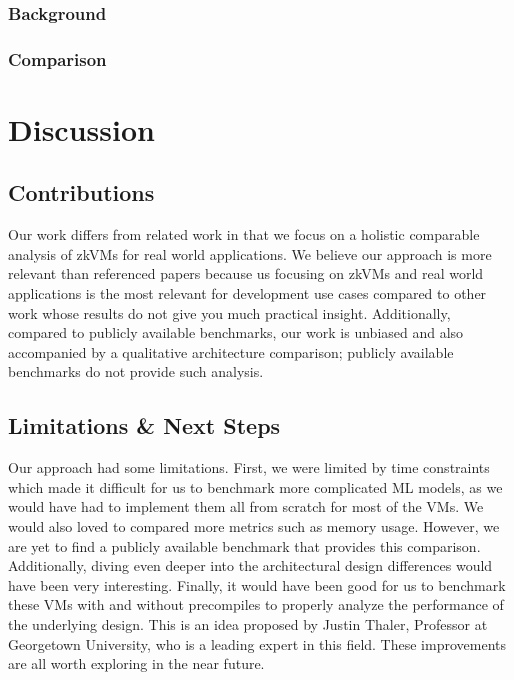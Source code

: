 \documentclass{scrartcl}
\begin{document}
\subsubsection{Background}

\subsubsection{Comparison}

\section{Discussion}
%

\subsection{Contributions}
Our work differs from related work in that we focus on a holistic comparable analysis of zkVMs for real world applications. We believe our approach is more relevant than referenced papers because us focusing on zkVMs and real world applications is the most relevant for development use cases compared to other work whose results do not give you much practical insight. Additionally, compared to publicly available benchmarks, our work is unbiased and also accompanied by a qualitative architecture comparison; publicly available benchmarks do not provide such analysis.

\subsection{Limitations \& Next Steps}
Our approach had some limitations. First, we were limited by time constraints which made it difficult for us to benchmark more complicated ML models, as we would have had to implement them all from scratch for most of the VMs. We would also loved to compared more metrics such as memory usage. However, we are yet to find a publicly available benchmark that provides this comparison. Additionally, diving even deeper into the architectural design differences would have been very interesting. Finally, it would have been good for us to benchmark these VMs with and without precompiles to properly analyze the performance of the underlying design. This is an idea proposed by Justin Thaler, Professor at Georgetown University, who is a leading expert in this field. These improvements are all worth exploring in the near future.
\end{document}
